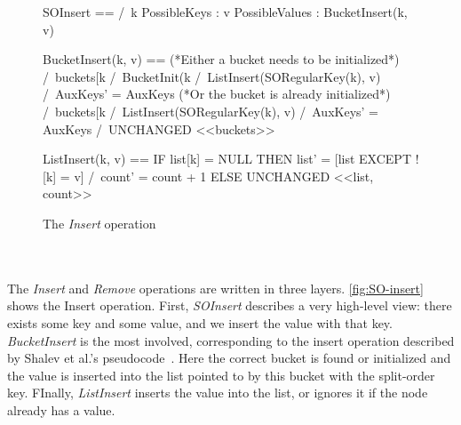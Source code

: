 \documentclass{uit-thesis}
\begin{document}
\begin{figure}
\begin{tla}
SOInsert == /\  \E k \in PossibleKeys :
                \E v \in PossibleValues :
                    BucketInsert(k, v)

BucketInsert(k, v) ==
(*Either a bucket needs to be initialized*)
    \/  /\ buckets[k %
        /\ BucketInit(k %
        /\ ListInsert(SORegularKey(k), v)
        /\ AuxKeys' = AuxKeys                       
    (*Or the bucket is already initialized*)
    \/  /\ buckets[k %
        /\ ListInsert(SORegularKey(k), v)
        /\ AuxKeys' = AuxKeys 
        /\ UNCHANGED <<buckets>>

ListInsert(k, v) == IF list[k] = NULL
                THEN list' = [list EXCEPT ![k] = v] /\ count' = count + 1
                ELSE UNCHANGED <<list, count>>

\end{tla} 
\begin{tlatex}
%
%
%
\@pvspace{8.0pt}%
%
\@x{}%
%
\@xx{}%
%
%
%
%
%
\@xx{}%
%
%
%
\@pvspace{8.0pt}%
%
%
\@pvspace{8.0pt}%
\end{tlatex}
\caption{The \textit{Insert} operation}
\label{fig:SO-insert}
\end{figure}
\\\\
The \textit{Insert} and \textit{Remove} operations are written in three layers. \autoref{fig:SO-insert} shows the Insert operation. First, \textit{SOInsert} describes a very high-level view: there exists some key and some value, and we insert the value with that key. \textit{BucketInsert} is the most involved, corresponding to the insert operation described by Shalev et al.'s pseudocode~\cite{Shalev2006}. Here the correct bucket is found or initialized and the value is inserted into the list pointed to by this bucket with the split-order key. FInally, \textit{ListInsert} inserts the value into the list, or ignores it if the node already has a value.
\end{document}
